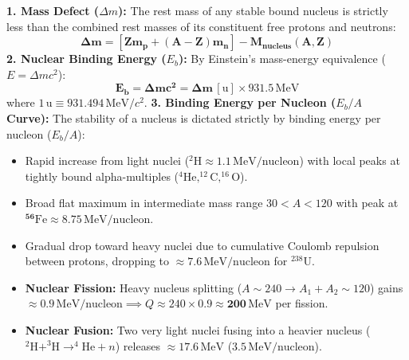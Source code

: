 \documentclass[10pt,twoside,openright]{book}
\begin{document}
\begin{formulabox}
\textbf{1. Mass Defect ($\Delta m$):}
The rest mass of any stable bound nucleus is strictly less than the combined rest masses of its constituent free protons and neutrons:
\begin{equation}
  \mathbf{\Delta m = [Z m_p + (A - Z) m_n] - M_{\text{nucleus}}(A, Z)}
\end{equation}
\textbf{2. Nuclear Binding Energy ($E_b$):}
By Einstein's mass-energy equivalence ($E = \Delta m c^2$):
\begin{equation}
  \mathbf{E_b = \Delta m c^2 = \Delta m\,[\mathrm{u}] \times 931.5\,\mathrm{MeV}}
\end{equation}
where $1\,\mathrm{u} \equiv 931.494\,\mathrm{MeV}/c^2$.
\textbf{3. Binding Energy per Nucleon ($E_b/A$ Curve):}
The stability of a nucleus is dictated strictly by binding energy per nucleon ($E_b/A$):
\begin{itemize}
  \item Rapid increase from light nuclei ($^2\mathrm{H} \approx 1.1\,\mathrm{MeV/nucleon}$) with local peaks at tightly bound alpha-multiples ($^4\mathrm{He}, ^{12}\mathrm{C}, ^{16}\mathrm{O}$).
  \item Broad flat maximum in intermediate mass range $30 < A < 120$ with peak at $\mathbf{^{56}\mathrm{Fe} \approx 8.75\,\mathrm{MeV/nucleon}}$.
  \item Gradual drop toward heavy nuclei due to cumulative Coulomb repulsion between protons, dropping to $\approx 7.6\,\mathrm{MeV/nucleon}$ for $^{238}\mathrm{U}$.
  \item \textbf{Nuclear Fission:} Heavy nucleus splitting ($A \sim 240 \to A_1 + A_2 \sim 120$) gains $\approx 0.9\,\mathrm{MeV/nucleon} \implies Q \approx 240 \times 0.9 \approx \mathbf{200\,\mathrm{MeV}}$ per fission.
  \item \textbf{Nuclear Fusion:} Two very light nuclei fusing into a heavier nucleus ($^2\mathrm{H} + ^3\mathrm{H} \to ^4\mathrm{He} + n$) releases $\approx \mathbf{17.6\,\mathrm{MeV}}$ ($3.5\,\mathrm{MeV/nucleon}$).
\end{itemize}
\end{formulabox}
\end{document}
